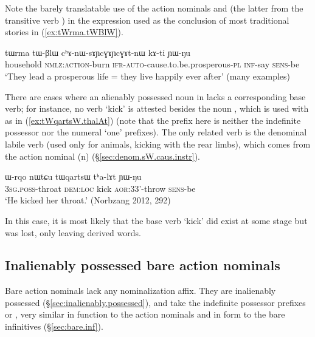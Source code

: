 Note the barely translatable use of the action nominals  and  (the latter from the transitive verb ) in the expression used as the conclusion of most traditional stories in (\ref{ex:tWrma.tWBlW}).

\begin{exe}
\ex \label{ex:tWrma.tWBlW}
\gll  tɯrma tɯ-βlɯ cʰɤ-nɯ-sɤɲcɣɤɲcɣɤt-nɯ kɤ-ti ɲɯ-ŋu \\
household \textsc{nmlz}:\textsc{action}-burn \textsc{ifr}-\textsc{auto}-cause.to.be.prosperous-\textsc{pl} \textsc{inf}-say \textsc{sens}-be \\
\glt `They lead a prosperous life = they live happily ever after' (many examples)
\end{exe}


There are cases where an alienably possessed noun in  lacks a corresponding base verb; for instance, no verb  `kick' is attested besides the noun , which is used with  as in (\ref{ex:tWqartsW.thalAt}) (note that the  prefix here is neither the indefinite possessor nor the numeral `one' prefixes). The only related verb is the denominal labile verb  (used only for animals, kicking with the rear limbs), which comes from the action nominal  (n) (§\ref{sec:denom.sW.caus.instr}).

\begin{exe}
\ex \label{ex:tWqartsW.thalAt}
\gll  ɯ-rqo nɯtɕu tɯqartsɯ tʰa-lɤt ɲɯ-ŋu \\
\textsc{3sg}.\textsc{poss}-throat \textsc{dem}:\textsc{loc} kick \textsc{aor}:3\fl{}3'-throw \textsc{sens}-be \\
\glt `He kicked her throat.' (Norbzang 2012, 292)
\end{exe}

In this case, it is most likely that the base verb  `kick' did exist at some stage but was lost, only leaving derived words.

\subsection{Inalienably possessed bare action nominals} \label{sec:bare.action.nominals}
Bare action nominals lack any nominalization affix. They are inalienably possessed (§\ref{sec:inalienably.possessed}), and take the indefinite possessor prefixes  or , very similar in function to the  action nominals and in form to the bare infinitives (§\ref{sec:bare.inf}).

